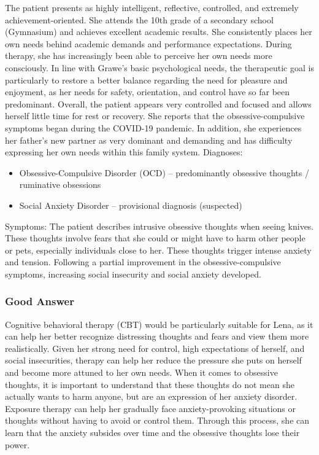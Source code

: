 The patient presents as highly intelligent, reflective, controlled, and extremely achievement-oriented.
She attends the 10th grade of a secondary school (Gymnasium) and achieves excellent academic results.
She consistently places her own needs behind academic demands and performance expectations.
During therapy, she has increasingly been able to perceive her own needs more consciously.
In line with Grawe’s basic psychological needs, the therapeutic goal is particularly to restore a better balance regarding the need for pleasure and enjoyment, as her needs for safety, orientation, and control have so far been predominant.
Overall, the patient appears very controlled and focused and allows herself little time for rest or recovery.
She reports that the obsessive-compulsive symptoms began during the COVID-19 pandemic.
In addition, she experiences her father’s new partner as very dominant and demanding and has difficulty expressing her own needs within this family system.
Diagnoses:
\begin{itemize}
\item Obsessive-Compulsive Disorder (OCD) – predominantly obsessive thoughts / ruminative obsessions
\item Social Anxiety Disorder – provisional diagnosis (suspected)
\end{itemize}
Symptoms: The patient describes intrusive obsessive thoughts when seeing knives.
These thoughts involve fears that she could or might have to harm other people or pets, especially individuals close to her.
These thoughts trigger intense anxiety and tension.
Following a partial improvement in the obsessive-compulsive symptoms, increasing social insecurity and social anxiety developed.
\subsubsection{Good Answer}
Cognitive behavioral therapy (CBT) would be particularly suitable for Lena, as it can help her better recognize distressing thoughts and fears and view them more realistically.
Given her strong need for control, high expectations of herself, and social insecurities, therapy can help her reduce the pressure she puts on herself and become more attuned to her own needs.
When it comes to obsessive thoughts, it is important to understand that these thoughts do not mean she actually wants to harm anyone, but are an expression of her anxiety disorder.
Exposure therapy can help her gradually face anxiety-provoking situations or thoughts without having to avoid or control them.
Through this process, she can learn that the anxiety subsides over time and the obsessive thoughts lose their power.
